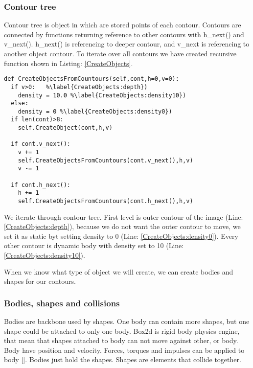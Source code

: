 \documentclass{ifacconf}
\begin{document}
\subsubsection{Contour tree}
Contour tree is object in which are stored points of each contour. Contours are
connected by functions returning reference to other contours with h\_next() and
v\_next(). h\_next() is referencing to deeper contour, and v\_next is
referencing to another object contour. To iterate over all contours we have
created recursive function shown in Listing: \ref{CreateObjects}.
\begin{lstlisting}[label=CreateObjects,caption=Function to iterate through
contour tree]
def CreateObjectsFromCountours(self,cont,h=0,v=0):
  if v>0:	%\label{CreateObjects:depth})
    density = 10.0 %\label{CreateObjects:density10})
  else:
    density = 0 %\label{CreateObjects:density0})
  if len(cont)>8:
    self.CreateObject(cont,h,v) 

  if cont.v_next():
    v += 1
    self.CreateObjectsFromCountours(cont.v_next(),h,v)
    v -= 1

  if cont.h_next():
    h += 1
    self.CreateObjectsFromCountours(cont.h_next(),h,v)
\end{lstlisting}
We iterate through contour tree. First level is outer contour of the image
(Line: \ref{CreateObjects:depth}), because we do not want the outer contour to
move, we set it as static byt setting density to 0 (Line:
\ref{CreateObjects:density0}). Every other contour is dynamic body with density
set to 10 (Line: \ref{CreateObjects:density10}).

When we know what type of object we will create, we can create bodies and
shapes for our contours.
\subsubsection{Bodies, shapes and collisions}
Bodies are backbone used by shapes. One body can contain more shapes, but one
shape could be attached to only one body. Box2d is rigid body physics engine,
that mean that shapes attached to body can not move against other, or body. Body
have position and velocity. Forces, torques and impulses can be applied to body
[\cite{Box2DManual}].  Bodies just hold the shapes. Shapes are elements that
collide together.
\end{document}

